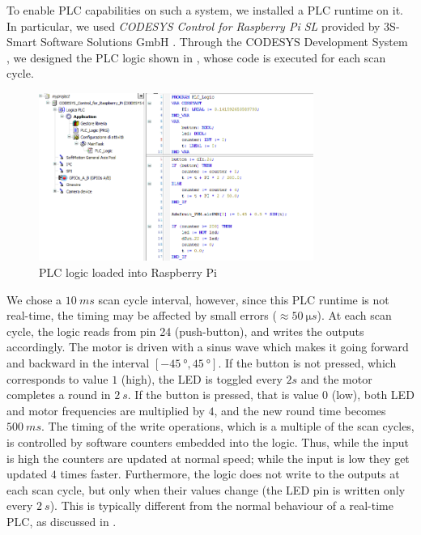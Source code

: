 To enable PLC capabilities on such a system, we installed a PLC runtime on it. In particular, we used \emph{CODESYS Control for Raspberry Pi SL}
provided by 3S-Smart Software Solutions GmbH \cite{codesys-runtime}. Through the CODESYS Development System \cite{codesys-dev},
we designed the PLC logic shown in , whose code is executed for each scan cycle.
\begin{figure}[h]
\centerline{\includegraphics[width=0.8\textwidth]{res/pi-logic}}
\caption{PLC logic loaded into Raspberry Pi \label{fig:pi-logic}}
\end{figure}
We chose a $\SI{10}{ms}$ scan cycle interval, however, since this PLC runtime is not real-time, the timing may be affected by small errors ($\approx \SI{50}{\micro s}$). 
At each scan cycle, the logic reads from pin 24 (push-button), and writes the outputs accordingly.
The motor is driven with a sinus wave which makes it going forward and backward in the interval $[\SI{-45}{\degree}, \SI{+45}{\degree}]$.
If the button is not pressed, which corresponds to value $1$ (high), the LED is toggled every $2s$ and the motor completes a round in $\SI{2}{s}$.
If the button is pressed, that is value $0$ (low), both LED and motor frequencies are multiplied by $4$, and the new round time becomes $\SI{500}{ms}$.
The timing of the write operations, which is a multiple of the scan cycles, is controlled by software counters embedded into the logic.
Thus, while the input is high the counters are updated at normal speed; while the input is low they get updated $4$ times faster.
Furthermore, the logic does not write to the outputs at each scan cycle, but only when their values change (\eg the LED pin is written only every $\SI{2}{s}$).
This is typically different from the normal behaviour of a real-time PLC, as discussed in .

